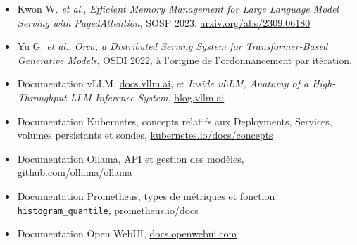 \documentclass[10pt,a4paper]{article}
\begin{document}
\begin{itemize}
\small

\item
Kwon W. \textit{et al.},
\textit{Efficient Memory Management for Large Language Model Serving with
PagedAttention}, SOSP 2023.
\href{https://arxiv.org/abs/2309.06180}
{arxiv.org/abs/2309.06180}

\item
Yu G. \textit{et al.},
\textit{Orca, a Distributed Serving System for Transformer-Based Generative
Models}, OSDI 2022, à l'origine de l'ordonnancement par itération.

\item
Documentation vLLM,
\href{https://docs.vllm.ai}{docs.vllm.ai}, et
\textit{Inside vLLM, Anatomy of a High-Throughput LLM Inference System},
\href{https://blog.vllm.ai/2025/09/05/anatomy-of-vllm.html}
{blog.vllm.ai}

\item
Documentation Kubernetes, concepts relatifs aux Deployments, Services,
volumes persistants et sondes,
\href{https://kubernetes.io/docs/concepts/}
{kubernetes.io/docs/concepts}

\item
Documentation Ollama, API et gestion des modèles,
\href{https://github.com/ollama/ollama/blob/main/docs/api.md}
{github.com/ollama/ollama}

\item
Documentation Prometheus, types de métriques et fonction
\texttt{histogram\_quantile},
\href{https://prometheus.io/docs/}
{prometheus.io/docs}

\item
Documentation Open WebUI,
\href{https://docs.openwebui.com}
{docs.openwebui.com}

\end{itemize}
\end{document}
